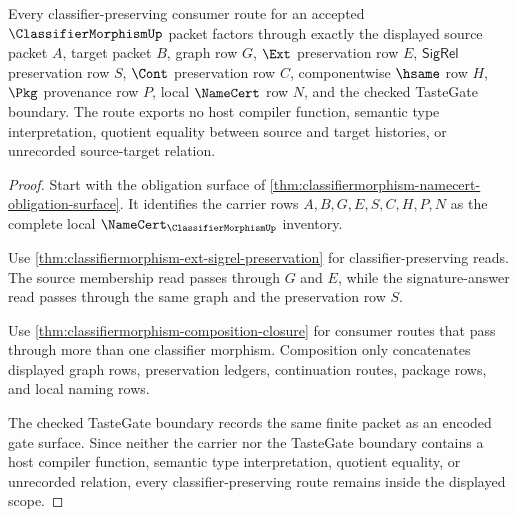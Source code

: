 \begin{theorem}
\label{thm:classifiermorphism-preservation-nonescape-scope}
Every classifier-preserving consumer route for an accepted $\ClassifierMorphismUp$ packet factors through exactly the displayed source packet $A$, target packet $B$, graph row $G$, $\Ext$ preservation row $E$, $\mathsf{SigRel}$ preservation row $S$, $\Cont$ preservation row $C$, componentwise $\hsame$ row $H$, $\Pkg$ provenance row $P$, local $\NameCert$ row $N$, and the checked TasteGate boundary. The route exports no host compiler function, semantic type interpretation, quotient equality between source and target histories, or unrecorded source-target relation.
\end{theorem}
\begin{proof}
Start with the obligation surface of \autoref{thm:classifiermorphism-namecert-obligation-surface}. It identifies the carrier rows $A,B,G,E,S,C,H,P,N$ as the complete local $\NameCert_{\ClassifierMorphismUp}$ inventory.

Use \autoref{thm:classifiermorphism-ext-sigrel-preservation} for classifier-preserving reads. The source membership read passes through $G$ and $E$, while the signature-answer read passes through the same graph and the preservation row $S$.

Use \autoref{thm:classifiermorphism-composition-closure} for consumer routes that pass through more than one classifier morphism. Composition only concatenates displayed graph rows, preservation ledgers, continuation routes, package rows, and local naming rows.

The checked TasteGate boundary records the same finite packet as an encoded gate surface. Since neither the carrier nor the TasteGate boundary contains a host compiler function, semantic type interpretation, quotient equality, or unrecorded relation, every classifier-preserving route remains inside the displayed scope.
\end{proof}

